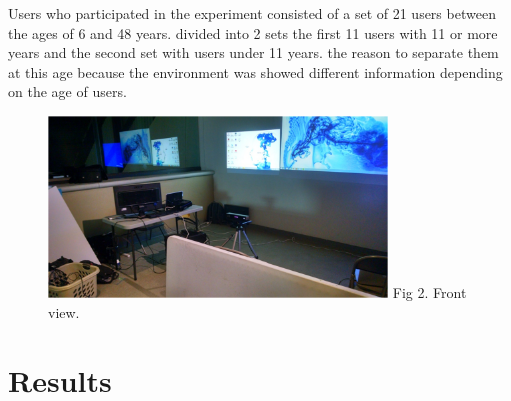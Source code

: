 \documentclass[journal]{IEEEtran}
\begin{document}
Users who participated in the experiment consisted of a set of 21 users between the ages of 6 and 48 years. divided into 2 sets the first 11 users with 11 or more years and the second set with users under 11 years. the reason to separate them at this age because the environment was showed different information depending on the age of users.
\begin{figure}[ht]
	\centering
	\includegraphics [width=90mm]{tromp2.PNG}
	\label{fig:Figure 2}
	Fig 2. Front view.
\end{figure}



 


\section {Results}

%
%

\end{document}
